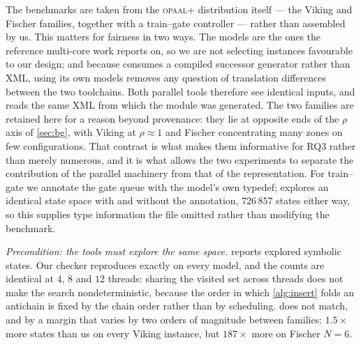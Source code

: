 The benchmarks are taken from the \textsc{opaal}+\ltsmin{} distribution itself --- the Viking
and Fischer families, together with a train--gate controller --- rather than assembled by us.
This matters for fairness in two ways. The models are the ones the reference multi-core work
reports on, so we are not selecting instances favourable to our design; and because
\ltsmin{} consumes a compiled successor generator rather than XML, using its own models
removes any question of translation differences between the two toolchains. Both parallel
tools therefore see identical inputs, and  reads the same XML from which the
\ltsmin{} module was generated. The two families are retained here for a reason beyond provenance: they lie at opposite ends
of the $\rho$ axis of \cref{sec:bg}, with Viking at $\rho \approx 1$ and Fischer
concentrating many zones on few configurations. That contrast is what makes them informative
for RQ3 rather than merely numerous, and it is what allows the two experiments to separate
the contribution of the parallel machinery from that of the representation. For train--gate we
annotate the gate queue with the model's own  typedef;  explores an
identical state space with and without the annotation, $726\,857$ states either way, so this
supplies type information the file omitted rather than modifying the benchmark.



\emph{Precondition: the tools must explore the same space.}
 reports explored symbolic states. Our checker reproduces 
exactly on every model, and the counts are identical at $4$, $8$ and $12$ threads: sharing the
visited set across threads does not make the search nondeterministic, because the order in
which \cref{alg:insert} folds an antichain is fixed by the chain order rather than by
scheduling. \ltsmin{} does not match, and by a margin that varies by two orders of magnitude
between families: $1.5\times$ more states than us on every Viking instance, but $187\times$
more on Fischer $N{=}6$.

